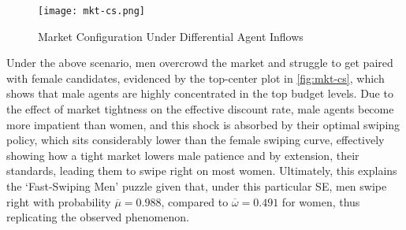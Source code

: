\begin{figure}[ht]
    \centering
    \caption{Market Configuration Under Differential Agent Inflows}
    \texttt{[image: mkt-cs.png]}
    \label{fig:mkt-cs} 
\end{figure} 

Under the above scenario, men overcrowd the market and struggle to get paired with female candidates, evidenced by the top-center plot in \autoref{fig:mkt-cs}, which shows that male agents are highly concentrated in the top budget levels. 
Due to the effect of market tightness on the effective discount rate, male agents become more impatient than women, and this shock is absorbed by their optimal swiping policy, which sits considerably lower than the female swiping curve, effectively showing how a tight market lowers male patience and by extension, their standards, leading them to swipe right on most women. 
Ultimately, this explains the `Fast-Swiping Men' puzzle given that, under this particular SE, men swipe right with probability $\overline\mu=0.988$, compared to $\overline\omega=0.491$ for women, thus replicating the observed phenomenon. 

